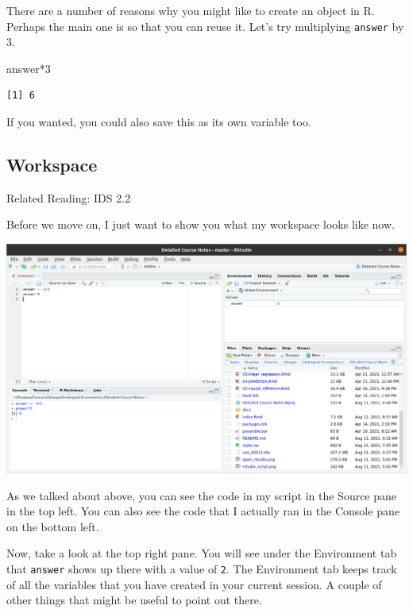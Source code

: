 \documentclass[
  letterpaper,
  DIV=11,
  numbers=noendperiod]{scrreprt}
\newenvironment{Shaded}{\begin{snugshade}}{\end{snugshade}}
\newcommand{\DecValTok}[1]{\textcolor[rgb]{0.68,0.00,0.00}{#1}}
\newcommand{\NormalTok}[1]{\textcolor[rgb]{0.00,0.23,0.31}{#1}}
\newcommand{\SpecialCharTok}[1]{\textcolor[rgb]{0.37,0.37,0.37}{#1}}
\begin{document}
There are a number of reasons why you might like to create an object in
R. Perhaps the main one is so that you can reuse it. Let's try
multiplying \texttt{answer} by \(3\).

\begin{Shaded}
\begin{Highlighting}[]
\NormalTok{answer}\SpecialCharTok{*}\DecValTok{3}
\end{Highlighting}
\end{Shaded}

\begin{verbatim}
[1] 6
\end{verbatim}

If you wanted, you could also save this as its own variable too.

\subsection{Workspace}\label{workspace}

Related Reading: IDS 2.2

Before we move on, I just want to show you what my workspace looks like
now.

\includegraphics{rstudio_environment.png}

As we talked about above, you can see the code in my script in the
Source pane in the top left. You can also see the code that I actually
ran in the Console pane on the bottom left.

Now, take a look at the top right pane. You will see under the
Environment tab that \texttt{answer} shows up there with a value of
\texttt{2}. The Environment tab keeps track of all the variables that
you have created in your current session. A couple of other things that
might be useful to point out there.
\end{document}
